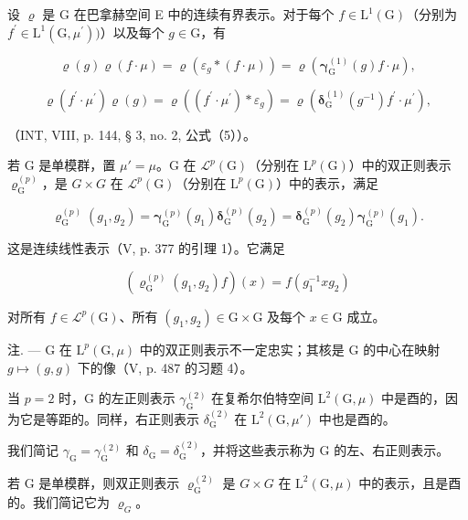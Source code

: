 设 \(\varrho\) 是 G 在巴拿赫空间 E 中的连续有界表示。对于每个 \(f\in \mathrm{L}^1 (\mathrm{G})\)（分别为 \(f^{\prime}\in \mathrm{L}^{1}(\mathrm{G},\mu^{\prime}))\)）以及每个 \(g\in \mathrm{G}\)，有

\[
\varrho (g) \varrho (f \cdot \mu) = \varrho (\varepsilon_ {g} * (f \cdot \mu)) = \varrho (\boldsymbol {\gamma} _ {\mathrm{G}} ^ {(1)} (g) f \cdot \mu),\tag{1}
\]

\[
\varrho (f ^ {\prime} \cdot \mu^ {\prime}) \varrho (g) = \varrho ((f ^ {\prime} \cdot \mu^ {\prime}) * \varepsilon_ {g}) = \varrho (\boldsymbol {\delta} _ {\mathrm{G}} ^ {(1)} (g ^ {- 1}) f ^ {\prime} \cdot \mu ^ {\prime}),\tag{2}
\]

（INT, VIII, p. 144, § 3, no. 2, 公式（5））。

若 G 是单模群，置 \(\mu' = \mu\)。G 在 \(\mathcal{L}^{p}(\mathrm{G})\)（分别在 \(\mathrm{L}^{p}(\mathrm{G})\)）中的双正则表示 \(\varrho_{\mathrm{G}}^{(p)}\)，是 \(G \times G\) 在 \(\mathcal{L}^{p}(\mathrm{G})\)（分别在 \(\mathrm{L}^{p}(\mathrm{G})\)）中的表示，满足

\[
\boldsymbol {\varrho} _ {\mathrm{G}} ^ {(p)} (g _ {1}, g _ {2}) = \boldsymbol {\gamma} _ {\mathrm{G}} ^ {(p)} (g _ {1}) \boldsymbol {\delta} _ {\mathrm{G}} ^ {(p)} (g _ {2}) = \boldsymbol {\delta} _ {\mathrm{G}} ^ {(p)} (g _ {2}) \boldsymbol {\gamma} _ {\mathrm{G}} ^ {(p)} (g _ {1}).
\]

这是连续线性表示（V, p. 377 的引理 1）。它满足

\[
(\boldsymbol {\varrho} _ {\mathrm{G}} ^ {(p)} (g _ {1}, g _ {2}) f) (x) = f (g _ {1} ^ {- 1} x g _ {2})
\]

对所有 \(f \in \mathcal{L}^p(\mathrm{G})\)、所有 \((g_1, g_2) \in \mathrm{G} \times \mathrm{G}\) 及每个 \(x \in \mathrm{G}\) 成立。

注. --- G 在 \(\mathrm{L}^{p}(\mathrm{G},\mu)\) 中的双正则表示不一定忠实；其核是 G 的中心在映射 \(g\mapsto(g,g)\) 下的像（V, p. 487 的习题 4）。

当 \(p = 2\) 时，G 的左正则表示 \(\gamma_{\mathrm{G}}^{(2)}\) 在复希尔伯特空间 \(\mathrm{L}^2 (\mathrm{G},\mu)\) 中是酉的，因为它是等距的。同样，右正则表示 \(\delta_{\mathrm{G}}^{(2)}\) 在 \(\mathrm{L}^2 (\mathrm{G},\mu')\) 中也是酉的。

我们简记 \(\gamma_{\mathrm{G}} = \gamma_{\mathrm{G}}^{(2)}\) 和 \(\delta_{\mathrm{G}} = \delta_{\mathrm{G}}^{(2)}\)，并将这些表示称为 G 的左、右正则表示。

若 G 是单模群，则双正则表示 \(\varrho_{\mathrm{G}}^{(2)}\) 是 \(G \times G\) 在 \(\mathrm{L}^{2}(\mathrm{G}, \mu)\) 中的表示，且是酉的。我们简记它为 \(\varrho_{G}\)。

